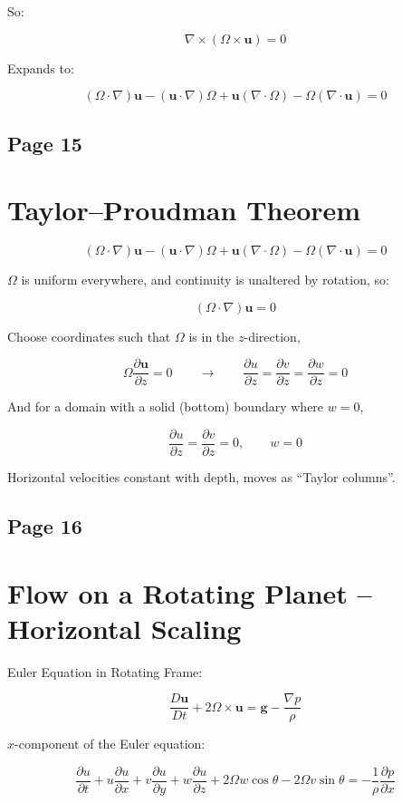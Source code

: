 \documentclass[11pt]{article}
\begin{document}
So:

\[
\nabla \times (\Omega \times \mathbf{u})=0
\]

Expands to:

\[
(\Omega\cdot\nabla)\mathbf{u}
-
(\mathbf{u}\cdot\nabla)\Omega
+
\mathbf{u}(\nabla\cdot\Omega)
-
\Omega(\nabla\cdot\mathbf{u})
=
0
\]

\subsection*{Page 15}
\section*{Taylor--Proudman Theorem}

\[
(\Omega\cdot\nabla)\mathbf{u}
-
(\mathbf{u}\cdot\nabla)\Omega
+
\mathbf{u}(\nabla\cdot\Omega)
-
\Omega(\nabla\cdot\mathbf{u})
=
0
\]

$\Omega$ is uniform everywhere, and continuity is unaltered by rotation, so:

\[
(\Omega\cdot\nabla)\mathbf{u}=0
\]

Choose coordinates such that $\Omega$ is in the $z$-direction,

\[
\Omega \frac{\partial \mathbf{u}}{\partial z}=0
\qquad\to\qquad
\frac{\partial u}{\partial z}
=
\frac{\partial v}{\partial z}
=
\frac{\partial w}{\partial z}
=
0
\]

And for a domain with a solid (bottom) boundary where $w=0$,

\[
\frac{\partial u}{\partial z}
=
\frac{\partial v}{\partial z}
=
0,
\qquad
w=0
\]

Horizontal velocities constant with depth, moves as ``Taylor columns''.

\subsection*{Page 16}
\section*{Flow on a Rotating Planet -- Horizontal Scaling}

Euler Equation in Rotating Frame:

\[
\frac{D\mathbf{u}}{Dt}+2\Omega\times\mathbf{u}
=
\mathbf{g}-\frac{\nabla p}{\rho}
\]

$x$-component of the Euler equation:

\[
\frac{\partial u}{\partial t}
+u\frac{\partial u}{\partial x}
+v\frac{\partial u}{\partial y}
+w\frac{\partial u}{\partial z}
+2\Omega w\cos\theta
-2\Omega v\sin\theta
=
-\frac{1}{\rho}\frac{\partial p}{\partial x}
\]
\end{document}
